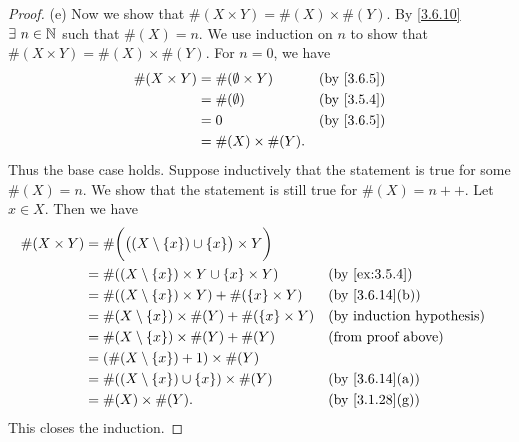 \begin{proof}{(e)}
  Now we show that \(\#(X \times Y) = \#(X) \times \#(Y)\).
  By \cref{3.6.10} \(\exists\ n \in \N\) such that \(\#(X) = n\).
  We use induction on \(n\) to show that \(\#(X \times Y) = \#(X) \times \#(Y)\).
  For \(n = 0\), we have
  \begin{align*}
    \#(X \times Y) & = \#(\emptyset \times Y) &  & \by{3.6.5} \\
                   & = \#(\emptyset)          &  & \by{3.5.4} \\
                   & = 0                      &  & \by{3.6.5} \\
                   & = \#(X) \times \#(Y).
  \end{align*}
  Thus the base case holds.
  Suppose inductively that the statement is true for some \(\#(X) = n\).
  We show that the statement is still true for \(\#(X) = n++\).
  Let \(x \in X\).
  Then we have
  \begin{align*}
    \#(X \times Y) & = \#\bigg(\big((X \setminus \{x\}) \cup \{x\}\big) \times Y\bigg)                                   \\
                   & = \#((X \setminus \{x\}) \times Y \cup \{x\} \times Y)            &  & \text{(by \cref{ex:3.5.4})}  \\
                   & = \#((X \setminus \{x\}) \times Y) + \#(\{x\} \times Y)           &  & \text{(by \cref{3.6.14}(b))} \\
                   & = \#(X \setminus \{x\}) \times \#(Y) + \#(\{x\} \times Y)         &  & \byIH                        \\
                   & = \#(X \setminus \{x\}) \times \#(Y) + \#(Y)                      &  & \text{(from proof above)}    \\
                   & = (\#(X \setminus \{x\}) + 1) \times \#(Y)                                                          \\
                   & = \#((X \setminus \{x\}) \cup \{x\}) \times \#(Y)                 &  & \text{(by \cref{3.6.14}(a))} \\
                   & = \#(X) \times \#(Y).                                             &  & \text{(by \cref{3.1.28}(g))}
  \end{align*}
  This closes the induction.
\end{proof}


